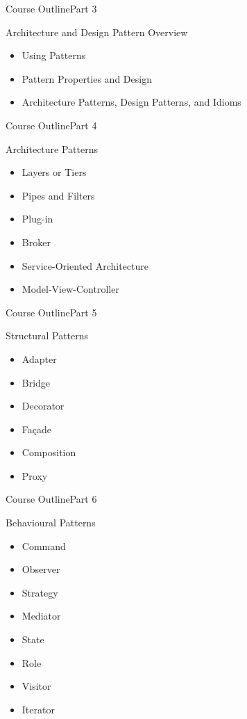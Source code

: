 \begin{frame}{Course Outline}{Part 3}
    \begin{block}{Architecture and Design Pattern Overview}
       \begin{itemize}
           \item Using Patterns
           \item Pattern Properties and Design
           \item Architecture Patterns, Design Patterns, and Idioms
       \end{itemize}
    \end{block}
\end{frame}

\begin{frame}{Course Outline}{Part 4}
    \begin{block}{Architecture Patterns}
       \begin{itemize}
           \item Layers or Tiers
           \item Pipes and Filters
           \item Plug-in
           \item Broker
           \item Service-Oriented Architecture
           \item Model-View-Controller
       \end{itemize}
    \end{block}
\end{frame}

\begin{frame}{Course Outline}{Part 5}
    \begin{block}{Structural Patterns}
       \begin{itemize}
           \item Adapter
           \item Bridge
           \item Decorator
           \item Façade
           \item Composition
           \item Proxy
       \end{itemize}
    \end{block}
\end{frame}

\begin{frame}{Course Outline}{Part 6}
    \begin{block}{Behavioural Patterns}
       \begin{itemize}
           \item Command
           \item Observer
           \item Strategy
           \item Mediator
           \item State
           \item Role
           \item Visitor
           \item Iterator
       \end{itemize}
    \end{block}
\end{frame}


